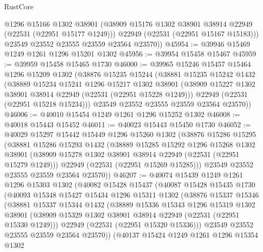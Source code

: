 \begin{lexlean}{RustCore}
\begin{coremodule}
          @1296
          @15166
          @1302
          @38901
          (@38909 @15176 @1302 @38901 @38914 @22949 (@22531 (@22951 @15177 @1249)))
          @22949
          (@22531 (@22951 @15167 @15183)))
        @23549
        @23552
        @23555
        @23559
        @23564
        @23570))
@45954 := @39946 @15469 @1249 @1261 @1296 @15201 @1302
@45956 := @39954 @15458 @15467
@45959 := @39959 @15458 @15465 @1730
@46000 := @39965
    @15246
    @15457
    @15464
    @1296
    @15209
    @1302
    (@38876
      @15235
      @15244
      (@38881
        @15235
        @15242
        @1432
        (@38889
          @15234
          @15241
          @1296
          @15217
          @1302
          @38901
          (@38909 @15227 @1302 @38901 @38914 @22949 (@22531 (@22951 @15228 @1249)))
          @22949
          (@22531 (@22951 @15218 @15234)))
        @23549
        @23552
        @23555
        @23559
        @23564
        @23570))
@46006 := @40010 @15454 @1249 @1261 @1296 @15252 @1302
@46008 := @40018 @15443 @15452
@46011 := @40023 @15443 @15450 @1730
@46052 := @40029
    @15297
    @15442
    @15449
    @1296
    @15260
    @1302
    (@38876
      @15286
      @15295
      (@38881
        @15286
        @15293
        @1432
        (@38889
          @15285
          @15292
          @1296
          @15268
          @1302
          @38901
          (@38909 @15278 @1302 @38901 @38914 @22949 (@22531 (@22951 @15279 @1249)))
          @22949
          (@22531 (@22951 @15269 @15285)))
        @23549
        @23552
        @23555
        @23559
        @23564
        @23570))
@46207 := @40074
    @15439
    @1249
    @1261
    @1296
    @15303
    @1302
    (@40082
      @15428
      @15437
      (@40087
        @15428
        @15435
        @1730
        (@40093
          @15348
          @15427
          @15434
          @1296
          @15311
          @1302
          (@38876
            @15337
            @15346
            (@38881
              @15337
              @15344
              @1432
              (@38889
                @15336
                @15343
                @1296
                @15319
                @1302
                @38901
                (@38909 @15329 @1302 @38901 @38914 @22949 (@22531 (@22951 @15330 @1249)))
                @22949
                (@22531 (@22951 @15320 @15336)))
              @23549
              @23552
              @23555
              @23559
              @23564
              @23570))
          (@40137
            @15424
            @1249
            @1261
            @1296
            @15354
            @1302

\end{coremodule}
\end{lexlean}
